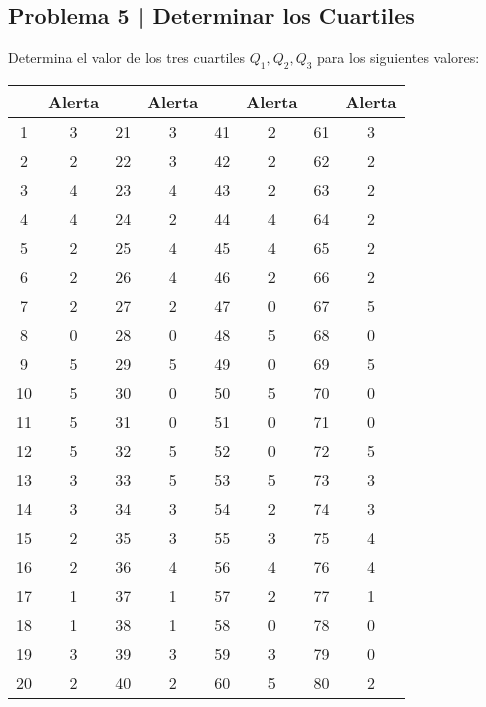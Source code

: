 \documentclass{article}
\begin{document}
\clearpage

\subsection{Problema 5 | Determinar los Cuartiles}

Determina el valor de los tres cuartiles $Q_1, Q_2, Q_3$ para los siguientes valores:
\begin{table}[!h]
    \centering
    \begin{tabular}{|c|c|c|c|c|c|c|c|}
        \hline
        \textbf{} & \textbf{Alerta} & \textbf{} & \textbf{Alerta} & \textbf{} & \textbf{Alerta} & \textbf{} & \textbf{Alerta} \\ \hline
        1  & 3  & 21 & 3 & 41 & 2 & 61 & 3 \\ \hline
        2  & 2  & 22 & 3 & 42 & 2 & 62 & 2 \\ \hline
        3  & 4  & 23 & 4 & 43 & 2 & 63 & 2 \\ \hline
        4  & 4  & 24 & 2 & 44 & 4 & 64 & 2 \\ \hline
        5  & 2  & 25 & 4 & 45 & 4 & 65 & 2 \\ \hline
        6  & 2  & 26 & 4 & 46 & 2 & 66 & 2 \\ \hline
        7  & 2  & 27 & 2 & 47 & 0 & 67 & 5 \\ \hline
        8  & 0  & 28 & 0 & 48 & 5 & 68 & 0 \\ \hline
        9  & 5  & 29 & 5 & 49 & 0 & 69 & 5 \\ \hline
        10 & 5  & 30 & 0 & 50 & 5 & 70 & 0 \\ \hline
        11 & 5  & 31 & 0 & 51 & 0 & 71 & 0 \\ \hline
        12 & 5  & 32 & 5 & 52 & 0 & 72 & 5 \\ \hline
        13 & 3  & 33 & 5 & 53 & 5 & 73 & 3 \\ \hline
        14 & 3  & 34 & 3 & 54 & 2 & 74 & 3 \\ \hline
        15 & 2  & 35 & 3 & 55 & 3 & 75 & 4 \\ \hline
        16 & 2  & 36 & 4 & 56 & 4 & 76 & 4 \\ \hline
        17 & 1  & 37 & 1 & 57 & 2 & 77 & 1 \\ \hline
        18 & 1  & 38 & 1 & 58 & 0 & 78 & 0 \\ \hline
        19 & 3  & 39 & 3 & 59 & 3 & 79 & 0 \\ \hline
        20 & 2  & 40 & 2 & 60 & 5 & 80 & 2 \\ \hline
    \end{tabular}
\end{table}
\end{document}
